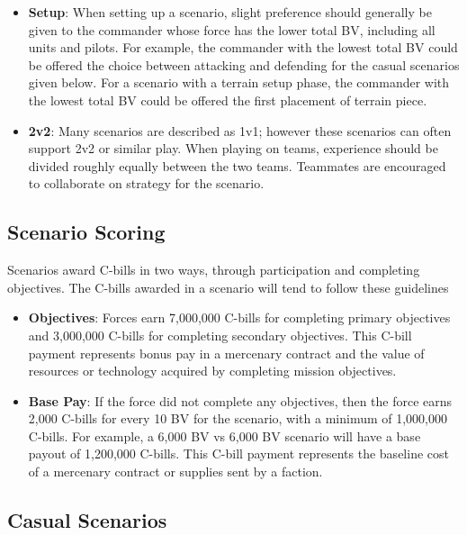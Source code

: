 \documentclass[UTF8]{article}
\begin{document}
\begin{itemize}

\item {\bf Setup}: When setting up a scenario, slight preference should generally be given to the commander whose force has the lower total BV, including all units and pilots.
For example, the commander with the lowest total BV could be offered the choice between attacking and defending for the casual scenarios given below.
For a scenario with a terrain setup phase, the commander with the lowest total BV could be offered the first placement of terrain piece.

\item {\bf 2v2}: Many scenarios are described as 1v1; however these scenarios can often support 2v2 or similar play.
When playing on teams, experience should be divided roughly equally between the two teams.
Teammates are encouraged to collaborate on strategy for the scenario.

\end{itemize}

\subsection{Scenario Scoring}

Scenarios award C-bills in two ways, through participation and completing objectives.
The C-bills awarded in a scenario will tend to follow these guidelines

\begin{itemize}

\item {\bf Objectives}: Forces earn 7,000,000 C-bills for completing primary objectives and 3,000,000 C-bills for completing secondary objectives.
This C-bill payment represents bonus pay in a mercenary contract and the value of resources or technology acquired by completing mission objectives.

\item {\bf Base Pay}: If the force did not complete any objectives, then the force earns 2,000 C-bills for every 10 BV for the scenario, with a minimum of 1,000,000 C-bills.
For example, a 6,000 BV vs 6,000 BV scenario will have a base payout of 1,200,000 C-bills.
This C-bill payment represents the baseline cost of a mercenary contract or supplies sent by a faction.

\end{itemize}

\subsection{Casual Scenarios}
\end{document}
